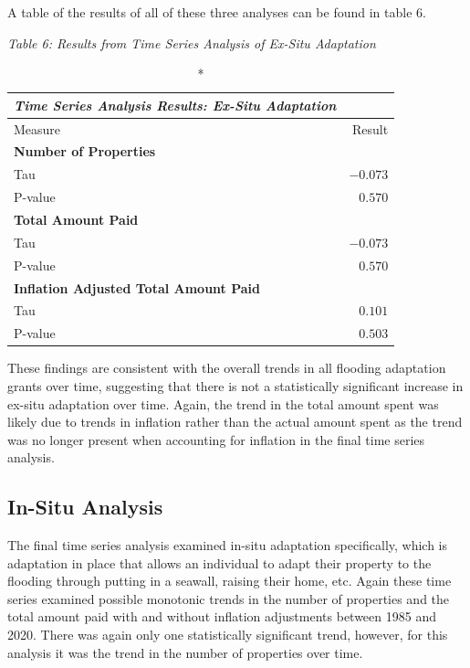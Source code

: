 \documentclass[
  12pt,
]{article}
\begin{document}
\newpage

A table of the results of all of these three analyses can be found in
table 6.

\emph{Table 6: Results from Time Series Analysis of Ex-Situ
Adaptation}\\
\captionsetup[table]{labelformat=empty,skip=1pt}

\begin{longtable}{lr}
\caption*{
{\large \emph{\textbf{Time Series Analysis Results: Ex-Situ Adaptation}}}
} \\ 
\toprule
Measure & Result \\ 
\midrule
\multicolumn{1}{l}{\textbf{Number of Properties}} \\ 
\midrule
Tau & $-0.073$ \\ 
P-value & $0.570$ \\ 
\midrule
\multicolumn{1}{l}{\textbf{Total Amount Paid}} \\ 
\midrule
Tau & $-0.073$ \\ 
P-value & $0.570$ \\ 
\midrule
\multicolumn{1}{l}{\textbf{Inflation Adjusted Total Amount Paid}} \\ 
\midrule
Tau & $0.101$ \\ 
P-value & $0.503$ \\ 
\bottomrule
\end{longtable}

These findings are consistent with the overall trends in all flooding
adaptation grants over time, suggesting that there is not a
statistically significant increase in ex-situ adaptation over time.
Again, the trend in the total amount spent was likely due to trends in
inflation rather than the actual amount spent as the trend was no longer
present when accounting for inflation in the final time series analysis.

\hypertarget{in-situ-analysis}{%
\subsection{In-Situ Analysis}\label{in-situ-analysis}}

The final time series analysis examined in-situ adaptation specifically,
which is adaptation in place that allows an individual to adapt their
property to the flooding through putting in a seawall, raising their
home, etc. Again these time series examined possible monotonic trends in
the number of properties and the total amount paid with and without
inflation adjustments between 1985 and 2020. There was again only one
statistically significant trend, however, for this analysis it was the
trend in the number of properties over time.
\end{document}
